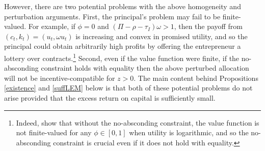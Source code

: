 \documentclass[11pt]{article}
\theoremstyle{plain}
\theoremstyle{definition} %
\begin{document}
However, there are two potential problems with the above homogeneity and perturbation arguments. First, the principal's problem may fail to be finite-valued. For example, if $\phi = 0$ and $(\Pi - \rho - \tau_I)\omega > 1$, then the payoff from $(c_t, k_t) = (u_t, \omega u_t)$ is increasing and convex in promised utility, and so the principal could obtain arbitrarily high profits by offering the entrepreneur a lottery over contracts.\footnote{Indeed, \cite{di_tella_optimal_2021} show that without the no-absconding constraint, the value function is not finite-valued for any $\phi \in [0,1]$ when utility is logarithmic, and so the no-absconding constraint is crucial even if it does not hold with equality.} Second, even if the value function were finite, if the no-absconding constraint holds with equality then the above perturbed allocation will not be incentive-compatible for $z > 0$. The main content behind Propositions \ref{existence} and \ref{suffLEM} below is that both of these potential problems do not arise provided that the excess return on capital is sufficiently small. 
\end{document}
